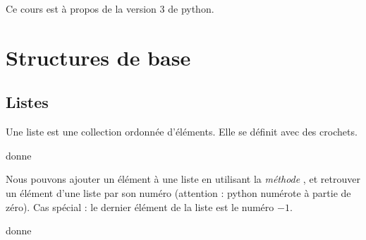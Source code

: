 
Ce cours est à propos de la version \( 3\) de python.

\chapter{Structures de base}

\section{Listes}

Une liste est une collection ordonnée d'éléments. Elle se définit avec des crochets.



donne



Nous pouvons ajouter un élément à une liste en utilisant la \emph{méthode} , et retrouver un élément d'une liste par son numéro (attention : python numérote à partie de zéro). Cas spécial : le dernier élément de la liste est le numéro \( -1\).



donne



